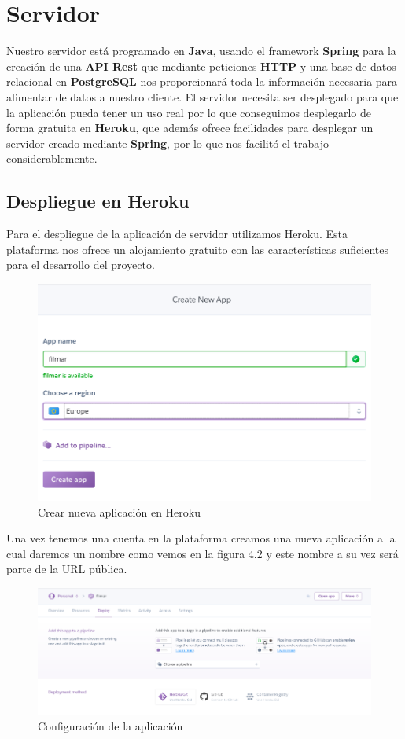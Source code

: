 \section{Servidor}
\label{makereference4.2}
Nuestro servidor está programado en \textbf{Java}, usando el framework \textbf{Spring} para la creación de una \textbf{API Rest} que mediante peticiones \textbf{HTTP} y una base de datos relacional en \textbf{PostgreSQL} nos proporcionará
toda la información necesaria para alimentar de datos a nuestro cliente. El servidor necesita ser desplegado para que la aplicación pueda tener un uso real por lo que conseguimos desplegarlo de forma gratuita en \textbf{Heroku}, que además ofrece
facilidades para desplegar un servidor creado mediante \textbf{Spring}, por lo que nos facilitó el trabajo considerablemente.
\subsection{Despliegue en Heroku}
\label{makereference4.2.1}
Para el despliegue de la aplicación de servidor utilizamos Heroku. Esta plataforma nos ofrece un alojamiento gratuito con las características suficientes para el desarrollo del proyecto.
\begin{figure}[H]
    \centering
    \includegraphics[width=6in]{figures/chapter-4/heroku_1.png}
    \caption{Crear nueva aplicación en Heroku}
\end{figure}
Una vez tenemos una cuenta en la plataforma creamos una nueva aplicación a la cual daremos un nombre como vemos en la figura 4.2 y este nombre a su vez será parte de la URL pública.
\begin{figure}[H]
    \centering
    \includegraphics[width=6in]{figures/chapter-4/heroku_2.png}
    \caption{Configuración de la aplicación}
\end{figure}
